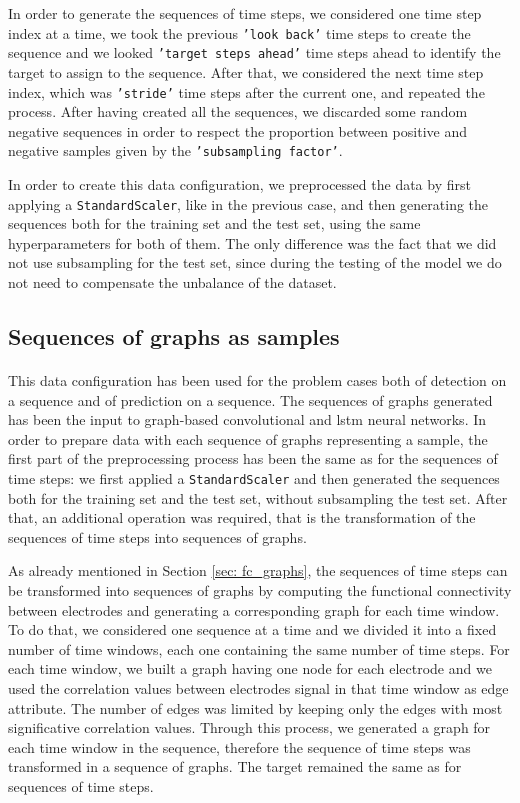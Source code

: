 In order to generate the sequences of time steps, we considered one time step index at a time, we took the previous \texttt{'look back'} time steps to create the sequence and we looked \texttt{'target steps ahead'} time steps ahead to identify the target to assign to the sequence. After that, we considered the next time step index, which was \texttt{'stride'} time steps after the current one, and repeated the process. After having created all the sequences, we discarded some random negative sequences in order to respect the proportion between positive and negative samples given by the \texttt{'subsampling factor'}.

In order to create this data configuration, we preprocessed the data by first applying a \texttt{StandardScaler}, like in the previous case, and then generating the sequences both for the training set and the test set, using the same hyperparameters for both of them. The only difference was the fact that we did not use subsampling for the test set, since during the testing of the model we do not need to compensate the unbalance of the dataset.

\subsection{Sequences of graphs as samples}
\paragraph{} This data configuration has been used for the problem cases both of detection on a sequence and of prediction on a sequence. The sequences of graphs generated has been the input to graph-based convolutional and 
\acs{lstm} neural networks. In order to prepare data with each sequence of graphs representing a sample, the first part of the preprocessing process has been the same as for the sequences of time steps: we first applied a \texttt{StandardScaler} and then generated the sequences both for the training set and the test set, without subsampling the test set. After that, an additional operation was required, that is the transformation of the sequences of time steps into sequences of graphs.

As already mentioned in Section \ref{sec: fc_graphs}, the sequences of time steps can be transformed into sequences of graphs by computing the functional connectivity between electrodes and generating a corresponding graph for each time window. To do that, we considered one sequence at a time and we divided it into a fixed number of time windows, each one containing the same number of time steps. For each time window, we built a graph having one node for each electrode and we used the correlation values between electrodes signal in that time window as edge attribute. The number of edges was limited by keeping only the edges with most significative correlation values. Through this process, we generated a graph for each time window in the sequence, therefore the sequence of time steps was transformed in a sequence of graphs. The target remained the same as for sequences of time steps.

